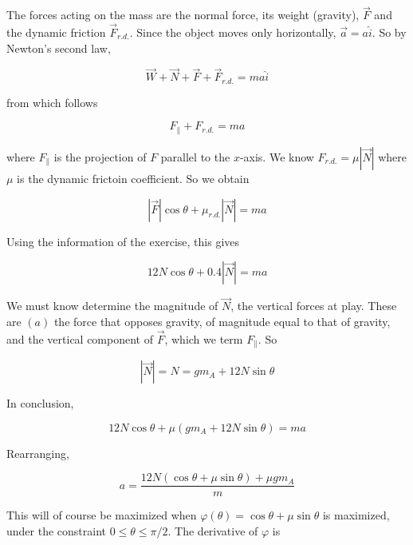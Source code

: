\documentclass[12pt]{article}
\theoremstyle{definition}
\begin{document}
The forces acting on the mass are the normal force, its weight (gravity),
$\vec{F}$ and the dynamic friction $\vec{F}_{r.d.}$. Since the object moves only
horizontally, $\vec{a} = a \hat{i}$. So by Newton's second law, 

\begin{equation*}
    \vec{W} + \vec{N} + \vec{F} + \vec{F}_{r.d.} = m a \hat{i}
\end{equation*}

from which follows 

\begin{equation}
    F_{\parallel} + F_{r.d.} = ma
\end{equation}

where $F_\parallel$ is the projection of $F$ parallel to the $x$-axis. We know
$F_{r.d.} = \mu \left| \vec{N} \right| $ where $\mu$ is the dynamic frictoin
coefficient. So we obtain

\begin{equation}
    \left| \vec{F} \right| \cos \theta + \mu_{r.d.} \left| \vec{N} \right| = ma
\end{equation}

Using the information of the exercise, this gives 

\begin{equation}
    12N \cos \theta + 0.4 \left| \vec{N} \right|  = ma
\end{equation}

We must know determine the magnitude of $\vec{N}$, the vertical forces at play.
These are $(a)$ the force that opposes gravity, of magnitude equal to that of
gravity, and the vertical component of $\vec{F}$, which we term $F_\parallel$.
So 

\begin{equation}
    \left| \vec{N} \right| = N = gm_A + 12N \sin \theta
\end{equation}

In conclusion, 

\begin{equation}
    12N \cos \theta + \mu\left( g m_A + 12N \sin \theta \right)  = ma
\end{equation}

Rearranging, 

\begin{equation}
    a = \frac{12N(\cos \theta + \mu\sin \theta) + \mu gm_A}{m}
\end{equation}

This will of course be maximized when $\varphi(\theta) = \cos \theta +
\mu \sin \theta$ is maximized, under the constraint $0 \leq \theta \leq
\pi / 2$. The derivative of $\varphi$ is 
\end{document}
